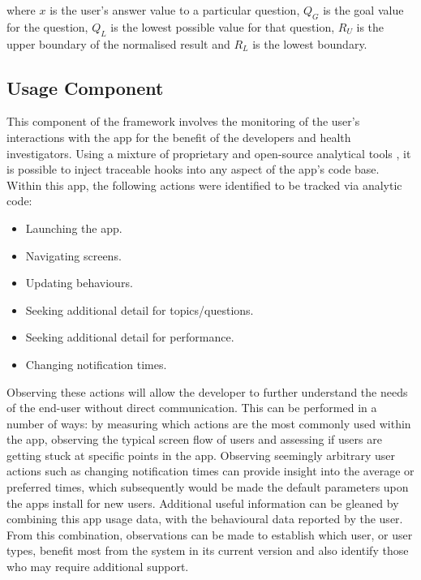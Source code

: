 where $x$ is the user’s answer value to a particular question, $Q_{G}$ is the goal value for the question, $Q_{L}$ is the lowest possible value for that question, $R_{U}$ is the upper boundary of the normalised result and $R_{L}$ is the lowest boundary.

\subsection{Usage Component}
This component of the framework involves the monitoring of the user's interactions with the app for the benefit of the developers and health investigators.
Using a mixture of proprietary and open-source analytical tools \cite{Hartin2014-IWAAL,GoogleAnalyticsWeb,MixpanelAnalytics}, it is possible to inject traceable hooks into any aspect of the app's code base. Within this app, the following actions were identified to be tracked via analytic code:
\begin{itemize}[noitemsep,topsep=0pt]
\item Launching the app.
\item Navigating screens.
\item Updating behaviours.
\item Seeking additional detail for topics/questions.
\item Seeking additional detail for performance.
\item Changing notification times.
\end{itemize}

Observing these actions will allow the developer to further understand the needs of the end-user without direct communication. This can be performed in a number of ways: by measuring which actions are the most commonly used within the app, observing the typical screen flow of users and assessing if users are getting stuck at specific points in the app. Observing seemingly arbitrary user actions such as changing notification times can provide insight into the average or preferred times, which subsequently would be made the default parameters upon the apps install for new users.
Additional useful information can be gleaned by combining this app usage data, with the behavioural data reported by the user. From this combination, observations can be made to establish which user, or user types, benefit most from the system in its current version and also identify those who may require additional support.

